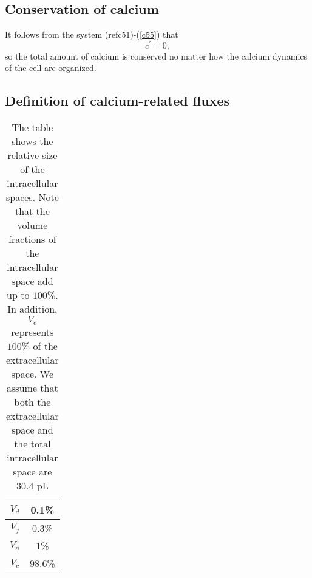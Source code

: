 \subsection{Conservation of calcium}

It follows from the system (ref{c51})-(\ref{c55}) that
\begin{equation}
c^{\prime}=0,
\end{equation}
so the total amount of calcium is conserved no matter how the calcium
dynamics of the cell are organized.



\subsection{Definition of calcium-related fluxes}

\begin{table}
\begin{center}
\begin{tabular}{|c|c|} \hline
$V_d$ & 0.1\% \\ \hline
$V_j$ & 0.3\% \\ \hline
$V_n$ & 1\% \\ \hline
$V_c$ & 98.6\% \\ \hline
\end{tabular}
\caption{The table shows the relative size of the intracellular spaces. Note that the volume fractions
of the intracellular space add up to $100\%$. In addition, $V_e$ represents $100\%$ of the extracellular space.
We assume that both the extracellular space and the total intracellular space are 30.4 pL
}
\end{center}
\end{table}

